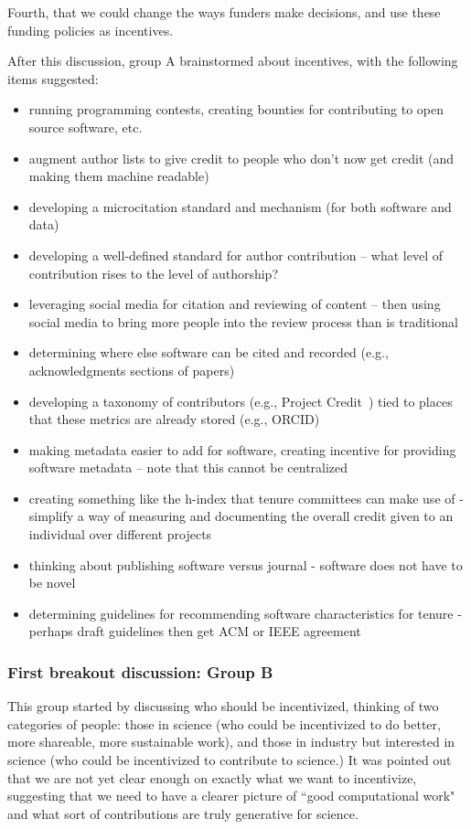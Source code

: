\documentclass[11pt, oneside]{amsart}
\begin{document}
Fourth, that we could change the ways funders make decisions, and use these funding
policies as incentives.

After this discussion, group A brainstormed about incentives,
with the following items suggested:
\begin{itemize}
\item running programming contests, creating bounties for contributing to open
source software, etc.
\item augment author lists to give credit to people who don't now get credit
(and making them machine readable)
\item developing a microcitation standard and mechanism (for both software and
data)
\item developing a well-defined standard for author contribution -- what level
of contribution rises to the level of authorship?
\item leveraging social media for citation and reviewing of content -- then
using social media to bring more people into the review process than is
traditional
\item determining where else software can be cited and recorded (e.g.,
acknowledgments sections of papers)
\item developing a taxonomy of contributors (e.g., Project Credit~\cite{projectcredit}) tied to places that these metrics
are already stored (e.g., ORCID) \cite{orcid}
\item making metadata easier to add for software, creating incentive for
providing software metadata -- note that this cannot be centralized
\item creating something like the h-index that tenure committees can make use of
- simplify a way of measuring and documenting the overall credit given to an
individual over different projects
\item thinking about publishing software versus journal - software does not have to
be novel
\item determining guidelines for recommending software characteristics for
tenure - perhaps draft guidelines then get ACM or IEEE agreement
\end{itemize}


\subsubsection{First breakout discussion: Group B}

This group started by discussing who should be incentivized, thinking of two
categories of people: those in science (who could be incentivized to do better,
more shareable, more sustainable work), and those in industry but interested in
science (who could be incentivized to contribute to science.) It was pointed out
that we are not yet clear enough on exactly what we want to incentivize,
suggesting that we need to have a clearer picture of ``good computational work"
and what sort of contributions are truly generative for science.
\end{document}
